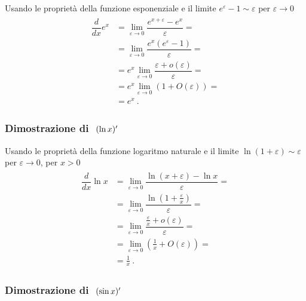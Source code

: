 \documentclass[letterpaper,10pt,italian]{jupyterBook}
\begin{document}
\sphinxAtStartPar
Usando le proprietà della funzione esponenziale e il limite \(e^{\varepsilon} - 1 \sim \varepsilon\) per \(\varepsilon \rightarrow 0\)
\begin{equation*}
\begin{split}\begin{aligned}
  \dfrac{d}{dx} e^x       
  & = \lim_{\varepsilon \rightarrow 0}  \dfrac{e^{x+\varepsilon} - e^x}{\varepsilon} = \\
  & = \lim_{\varepsilon \rightarrow 0}  \dfrac{e^x \left( e^{\varepsilon} - 1 \right)}{\varepsilon} = \\
  & = e^x \lim_{\varepsilon \rightarrow 0}  \dfrac{\varepsilon + o(\varepsilon)}{\varepsilon} = \\
  & = e^x \lim_{\varepsilon \rightarrow 0}  \left( 1 + O(\varepsilon) \right) = \\
  & = e^x \ .
\end{aligned}\end{split}
\end{equation*}\subsubsection*{Dimostrazione di \protect\(\ (\ln x)'\protect\)}

\sphinxAtStartPar
Usando le proprietà della funzione logaritmo naturale e il limite \(\ln(1 + \varepsilon) \sim \varepsilon\) per \(\varepsilon \rightarrow 0\), per \(x > 0\)
\begin{equation*}
\begin{split}\begin{aligned}
  \dfrac{d}{dx} \ln x       
  & = \lim_{\varepsilon \rightarrow 0}  \dfrac{\ln(x+\varepsilon) - \ln x}{\varepsilon} = \\
  & = \lim_{\varepsilon \rightarrow 0}  \dfrac{\ln \left(1 + \frac{\varepsilon}{x} \right)}{\varepsilon} = \\
  & = \lim_{\varepsilon \rightarrow 0}  \dfrac{\frac{\varepsilon}{x} + o(\varepsilon)}{\varepsilon} = \\
  & = \lim_{\varepsilon \rightarrow 0}  \left( \frac{1}{x} + O(\varepsilon) \right) = \\
  & = \frac{1}{x} \ .
\end{aligned}\end{split}
\end{equation*}\subsubsection*{Dimostrazione di \protect\(\ (\sin x)'\protect\)}
\end{document}
